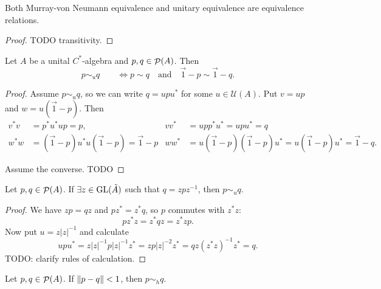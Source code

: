 \begin{lemma}
Both Murray-von Neumann equivalence and unitary equivalence are equivalence relations.
\end{lemma}
\begin{proof}
TODO transitivity.
\end{proof}

\begin{lemma}
Let $A$ be a unital $C^*$-algebra and $p,q\in\mathop{\mathcal{P}}\nolimits(A)$. Then
\[ p \sim_u q \qquad \iff p \sim q \quad \text{and}\quad \vec{1} - p \sim \vec{1} - q. \]
\end{lemma}
\begin{proof}
Assume $p \sim_u q$, so we can write $q = upu^*$ for some $u\in\mathcal{U}(A)$. Put $v = up$ and $w = u(\vec{1}-p)$. Then
\begin{align*}
v^*v &= p^*u^*up = p, & vv^* &= upp^*u^* = upu^* = q \\
w^*w &= (\vec{1}-p)u^*u(\vec{1}-p) = \vec{1} - p & ww^* &= u(\vec{1}-p)(\vec{1}-p)u^* = u(\vec{1}-p)u^* = \vec{1} - q.
\end{align*}

Assume the converse. TODO
\end{proof}

\begin{lemma}
Let $p,q\in \mathop{\mathcal{P}}\nolimits(A)$. If $\exists z\in \operatorname{GL}(\tilde{A})$ such that $q = zpz^{-1}$, then $p\sim_u q$.
\end{lemma}
\begin{proof}
We have $zp = qz$ and $pz^* = z^*q$, so $p$ commutes with $z^*z$:
\[ pz^*z = z^*qz = z^*zp. \]
Now put $u = z|z|^{-1}$ and calculate
\[ upu^* = z|z|^{-1}p|z|^{-1}z^* = zp|z|^{-2}z^* = qz(z^*z)^{-1}z^* = q. \]
TODO: clarify rules of calculation.
\end{proof}

\begin{proposition}
Let  $p,q\in \mathop{\mathcal{P}}\nolimits(A)$. If $\lVert p-q\rVert< 1$, then $p \sim_h q$.
\end{proposition}


